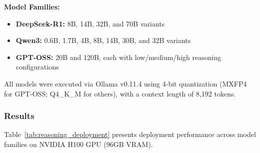 \textbf{Model Families:}
\begin{itemize}[leftmargin=*]
    \item \textbf{DeepSeek-R1:} 8B, 14B, 32B, and 70B variants
    \item \textbf{Qwen3:} 0.6B, 1.7B, 4B, 8B, 14B, 30B, and 32B variants
    \item \textbf{GPT-OSS:} 20B and 120B, each with low/medium/high reasoning configurations
\end{itemize}

All models were executed via Ollama v0.11.4 using 4-bit quantization (MXFP4 for GPT-OSS; Q4\_K\_M for others), with a context length of 8,192 tokens.

\subsubsection{Results}

Table~\ref{tab:reasoning_deployment} presents deployment performance across model families on NVIDIA H100 GPU (96GB VRAM).

